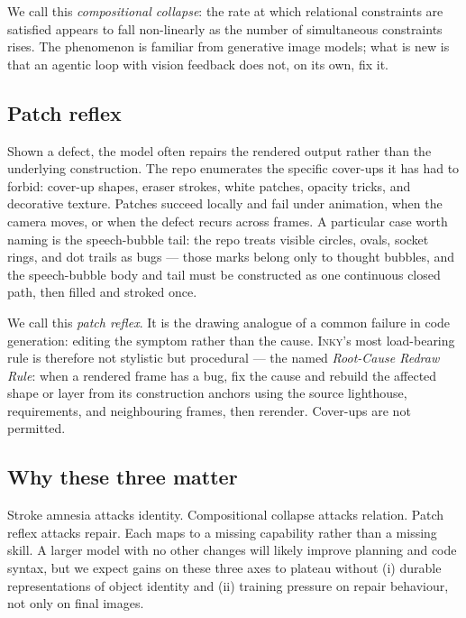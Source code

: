 \documentclass[10pt,twocolumn]{article}
\newcommand{\term}[1]{\textit{#1}}
\newcommand{\inky}{\textsc{Inky}}
\begin{document}
We call this \term{compositional collapse}: the rate at which
relational constraints are satisfied appears to fall non-linearly as
the number of simultaneous constraints rises. The phenomenon is
familiar from generative image models; what is new is that an
agentic loop with vision feedback does not, on its own, fix it.

\subsection{Patch reflex}

Shown a defect, the model often repairs the rendered output rather
than the underlying construction. The repo enumerates the specific
cover-ups it has had to forbid: cover-up shapes, eraser strokes,
white patches, opacity tricks, and decorative texture. Patches
succeed locally and fail under animation, when the camera moves, or
when the defect recurs across frames. A particular case worth naming
is the speech-bubble tail: the repo treats visible circles, ovals,
socket rings, and dot trails as bugs --- those marks belong only to
thought bubbles, and the speech-bubble body and tail must be
constructed as one continuous closed path, then filled and stroked
once.

We call this \term{patch reflex}. It is the drawing analogue of a
common failure in code generation: editing the symptom rather than
the cause. \inky{}'s most load-bearing rule is therefore not
stylistic but procedural --- the named \emph{Root-Cause Redraw Rule}:
when a rendered frame has a bug, fix the cause and rebuild the
affected shape or layer from its construction anchors using the
source lighthouse, requirements, and neighbouring frames, then
rerender. Cover-ups are not permitted.

\subsection{Why these three matter}

Stroke amnesia attacks identity. Compositional collapse attacks
relation. Patch reflex attacks repair. Each maps to a missing
capability rather than a missing skill. A larger model with no other
changes will likely improve planning and code syntax, but we expect
gains on these three axes to plateau without (i) durable
representations of object identity and (ii) training pressure on
repair behaviour, not only on final images.

\end{document}
